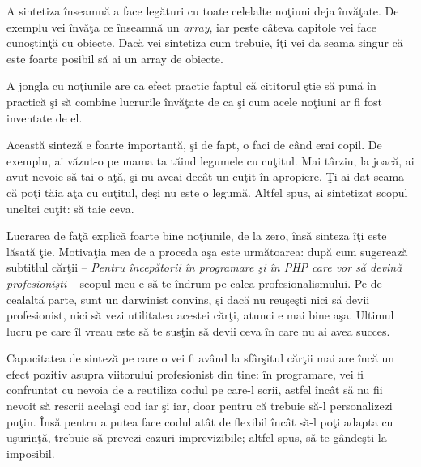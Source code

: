 
A sintetiza înseamnă a face legături cu toate celelalte noţiuni
deja învăţate. De exemplu vei învăţa ce înseamnă un \textsl{array}, iar peste
câteva capitole vei face cunoştinţă cu obiecte. Dacă vei sintetiza
cum trebuie, îţi vei da seama singur că este foarte posibil
să ai un array de obiecte.

A jongla cu noţiunile are ca efect practic faptul că cititorul ştie
să pună în practică şi să combine lucrurile învăţate de ca şi cum
acele noţiuni ar fi fost inventate de el.


Această sinteză e foarte importantă, şi de fapt, o faci de când erai
copil. De exemplu, ai văzut-o pe mama ta tăind legumele cu cuţitul.
Mai târziu, la joacă, ai avut nevoie să tai o aţă, şi nu aveai decât
un cuţit în apropiere. Ţi-ai dat seama că poţi tăia aţa cu cuţitul,
deşi nu este o legumă. Altfel spus, ai sintetizat scopul uneltei
{\glqq}cuţit{\grqq}: să taie ceva.

Lucrarea de faţă explică foarte bine noţiunile, de la zero, însă
sinteza îţi este lăsată ţie. Motivaţia mea de a proceda aşa este următoarea:
după cum sugerează subtitlul cărţii -- \textit{Pentru începătorii în programare şi în PHP care vor să devină profesionişti} -- scopul meu e să te îndrum pe calea profesionalismului.
Pe de cealaltă parte, sunt un darwinist convins, şi dacă nu reuşeşti
nici să devii profesionist, nici să vezi utilitatea acestei cărţi, atunci
e mai bine aşa. Ultimul lucru pe care îl vreau este să te susţin
să devii ceva în care nu ai avea succes.

Capacitatea de sinteză pe care o vei fi având la sfârşitul cărţii
mai are încă un efect pozitiv asupra viitorului profesionist din tine:
în programare, vei fi confruntat cu nevoia de a reutiliza codul pe care-l scrii, astfel
încât să nu fii nevoit să rescrii acelaşi cod iar şi iar, doar pentru
că trebuie să-l personalizezi puţin. Însă pentru a putea face
codul atât de flexibil încât să-l poţi adapta cu uşurinţă, trebuie
să prevezi cazuri {\glqq}imprevizibile{\grqq}; altfel spus, să te gândeşti
la imposibil.

